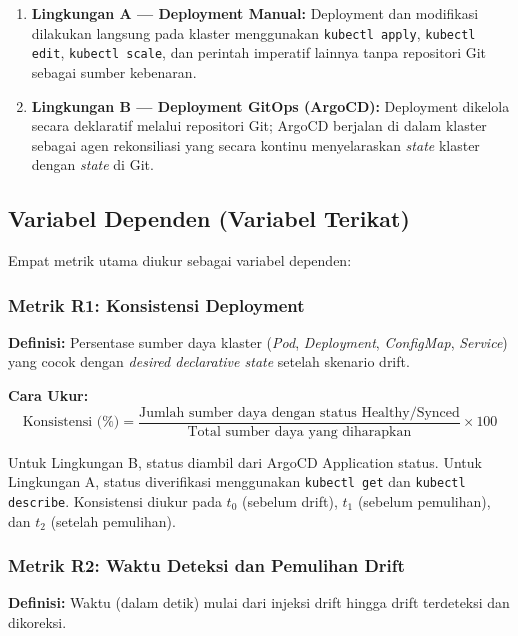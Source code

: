 \begin{enumerate}
    \item \textbf{Lingkungan A --- Deployment Manual:} Deployment dan modifikasi dilakukan langsung pada klaster menggunakan \texttt{kubectl apply}, \texttt{kubectl edit}, \texttt{kubectl scale}, dan perintah imperatif lainnya tanpa repositori Git sebagai sumber kebenaran.
    
    \item \textbf{Lingkungan B --- Deployment GitOps (ArgoCD):} Deployment dikelola secara deklaratif melalui repositori Git; ArgoCD berjalan di dalam klaster sebagai agen rekonsiliasi yang secara kontinu menyelaraskan \textit{state} klaster dengan \textit{state} di Git.
\end{enumerate}

\subsection{Variabel Dependen (Variabel Terikat)}

Empat metrik utama diukur sebagai variabel dependen:

\subsubsection{Metrik R1: Konsistensi Deployment}
\textbf{Definisi:} Persentase sumber daya klaster (\textit{Pod}, \textit{Deployment}, \textit{ConfigMap}, \textit{Service}) yang cocok dengan \textit{desired declarative state} setelah skenario drift.

\textbf{Cara Ukur:}
\[
\text{Konsistensi (\%)} = \frac{\text{Jumlah sumber daya dengan status Healthy/Synced}}{\text{Total sumber daya yang diharapkan}} \times 100
\]

Untuk Lingkungan B, status diambil dari ArgoCD Application status. Untuk Lingkungan A, status diverifikasi menggunakan \texttt{kubectl get} dan \texttt{kubectl describe}. Konsistensi diukur pada $t_0$ (sebelum drift), $t_1$ (sebelum pemulihan), dan $t_2$ (setelah pemulihan).

\subsubsection{Metrik R2: Waktu Deteksi dan Pemulihan Drift}
\textbf{Definisi:} Waktu (dalam detik) mulai dari injeksi drift hingga drift terdeteksi dan dikoreksi.

